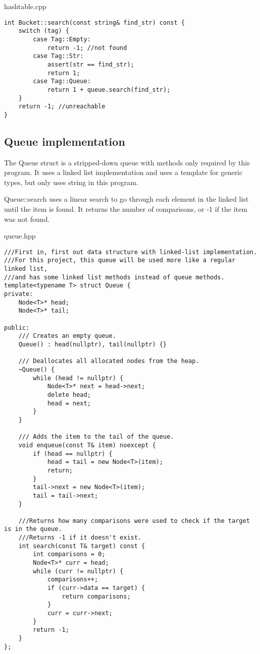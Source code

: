 \documentclass[letterpaper, 10pt,DIV=13]{scrartcl}
\numberwithin{equation}{section} %
\numberwithin{figure}{section} %
\numberwithin{table}{section} %
\begin{document}
hashtable.cpp
\begin{verbatim}
int Bucket::search(const string& find_str) const {
    switch (tag) {
        case Tag::Empty:
            return -1; //not found
        case Tag::Str:
            assert(str == find_str);
            return 1;
        case Tag::Queue:
            return 1 + queue.search(find_str);
    }
    return -1; //unreachable
}
\end{verbatim}

\subsection{Queue implementation}

The Queue struct is a stripped-down queue with methods only required by this program. It uses a linked list
implementation and uses a template for generic types, but only uses string in this program.

Queue::search uses a linear search to go through each element in the linked list until the item is found.
It returns the number of comparisons, or -1 if the item was not found.

queue.hpp
\begin{verbatim}
///First in, first out data structure with linked-list implementation.
///For this project, this queue will be used more like a regular linked list,
///and has some linked list methods instead of queue methods.
template<typename T> struct Queue {
private:
    Node<T>* head;
    Node<T>* tail;

public:
    /// Creates an empty queue.
    Queue() : head(nullptr), tail(nullptr) {}

    /// Deallocates all allocated nodes from the heap.
    ~Queue() {
        while (head != nullptr) {
            Node<T>* next = head->next;
            delete head;
            head = next;
        }
    }

    /// Adds the item to the tail of the queue.
    void enqueue(const T& item) noexcept {
        if (head == nullptr) {
            head = tail = new Node<T>(item);
            return;
        }
        tail->next = new Node<T>(item);
        tail = tail->next;
    }

    ///Returns how many comparisons were used to check if the target is in the queue.
    ///Returns -1 if it doesn't exist.
    int search(const T& target) const {
        int comparisons = 0;
        Node<T>* curr = head;
        while (curr != nullptr) {
            comparisons++;
            if (curr->data == target) {
                return comparisons;
            }
            curr = curr->next;
        }
        return -1;
    }
};
\end{verbatim}
\end{document}
